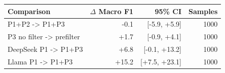 \begin{tabular}{lrrr}
\toprule
\textbf{Comparison} & \textbf{$\Delta$ Macro F1} & \textbf{95\% CI} & \textbf{Samples} \\
\midrule
P1+P2 -> P1+P3 & -0.1 & [-5.9, +5.9] & 1000 \\
P3 no filter -> prefilter & +1.7 & [-0.9, +4.1] & 1000 \\
DeepSeek P1 -> P1+P3 & +6.8 & [-0.1, +13.2] & 1000 \\
Llama P1 -> P1+P3 & +15.2 & [+7.5, +23.1] & 1000 \\
\bottomrule
\end{tabular}
